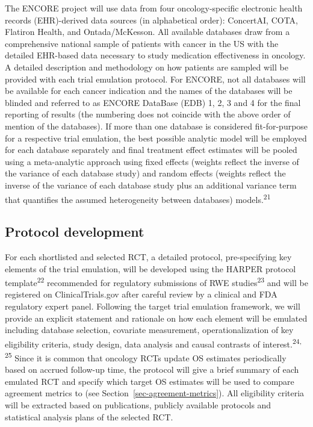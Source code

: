 \documentclass[
  letterpaper,
  DIV=11,
  numbers=noendperiod]{scrartcl}
\begin{document}
The ENCORE project will use data from four oncology-specific electronic
health records (EHR)-derived data sources (in alphabetical order):
ConcertAI, COTA, Flatiron Health, and Ontada/McKesson. All available
databases draw from a comprehensive national sample of patients with
cancer in the US with the detailed EHR-based data necessary to study
medication effectiveness in oncology. A detailed description and
methodology on how patients are sampled will be provided with each trial
emulation protocol. For ENCORE, not all databases will be available for
each cancer indication and the names of the databases will be blinded
and referred to as ENCORE DataBase (EDB) 1, 2, 3 and 4 for the final
reporting of results (the numbering does not coincide with the above
order of mention of the databases). If more than one database is
considered fit-for-purpose for a respective trial emulation, the best
possible analytic model will be employed for each database separately
and final treatment effect estimates will be pooled using a
meta-analytic approach using fixed effects (weights reflect the inverse
of the variance of each database study) and random effects (weights
reflect the inverse of the variance of each database study plus an
additional variance term that quantifies the assumed heterogeneity
between databases) models.\textsuperscript{21}

\subsection{Protocol development}\label{protocol-development}

For each shortlisted and selected RCT, a detailed protocol,
pre-specifying key elements of the trial emulation, will be developed
using the HARPER protocol template\textsuperscript{22} recommended for
regulatory submissions of RWE studies\textsuperscript{23} and will be
registered on ClinicalTrials.gov after careful review by a clinical and
FDA regulatory expert panel. Following the target trial emulation
framework, we will provide an explicit statement and rationale on how
each element will be emulated including database selection, covariate
measurement, operationalization of key eligibility criteria, study
design, data analysis and causal contrasts of
interest.\textsuperscript{24, 25} Since it is common that oncology RCTs
update OS estimates periodically based on accrued follow-up time, the
protocol will give a brief summary of each emulated RCT and specify
which target OS estimates will be used to compare agreement metrics to
(see Section~\ref{sec-agreement-metrics}). All eligibility criteria will
be extracted based on publications, publicly available protocols and
statistical analysis plans of the selected RCT.
\end{document}
